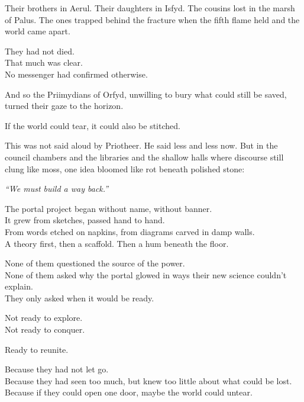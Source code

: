 \documentclass[9pt]{article}
\begin{document}
\vspace{0.5em}
Their brothers in Aerul. Their daughters in Isfyd. The cousins lost in the marsh of Palus. The ones trapped behind the fracture when the fifth flame held and the world came apart.

\vspace{0.5em}
They had not died.\\
That much was clear.\\
No messenger had confirmed otherwise.

\vspace{0.5em}
And so the Priimydians of Orfyd, unwilling to bury what could still be saved, turned their gaze to the horizon.

\vspace{0.5em}
If the world could tear, it could also be stitched.

\vspace{0.5em}
This was not said aloud by Priotheer. He said less and less now. But in the council chambers and the libraries and the shallow halls where discourse still clung like moss, one idea bloomed like rot beneath polished stone:

\vspace{0.5em}
\textit{``We must build a way back.''}

\vspace{0.5em}
The portal project began without name, without banner.\\
It grew from sketches, passed hand to hand.\\
From words etched on napkins, from diagrams carved in damp walls.\\
A theory first, then a scaffold. Then a hum beneath the floor.

\vspace{0.5em}
None of them questioned the source of the power.\\
None of them asked why the portal glowed in ways their new science couldn’t explain.\\
They only asked when it would be ready.

\vspace{0.5em}
Not ready to explore.\\
Not ready to conquer.

\vspace{0.5em}
Ready to reunite.

\vspace{0.5em}
Because they had not let go.\\
Because they had seen too much, but knew too little about what could be lost.\\
Because if they could open one door, maybe the world could untear.
\end{document}
